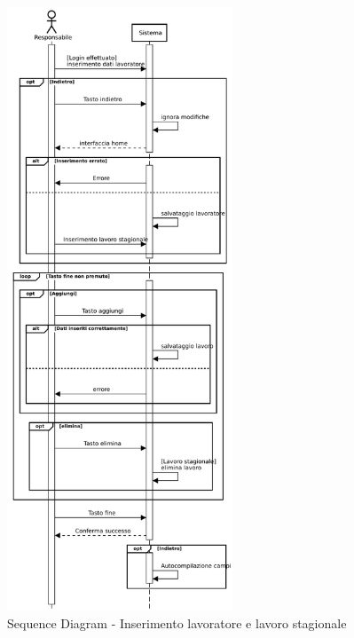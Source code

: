 \documentclass[a4paper,11pt]{article}
\begin{document}
\begin{figure}[htpb]
	\centering
	\includegraphics[width=0.6\textwidth]{diagrams/Sequence_Diagram_-_Inserimento-lavoratore_1.pdf}
	\caption{Sequence Diagram - Inserimento lavoratore e lavoro stagionale}
	\label{fig:seq_dia_ins_lavoratore}
\end{figure}
\end{document}
